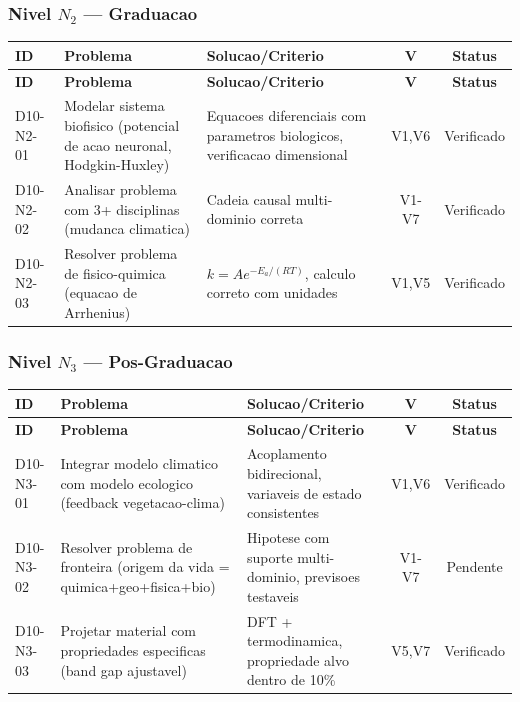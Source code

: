 \subsubsection{Nivel $N_2$ --- Graduacao}

\begin{longtable}{|p{2.0cm}|p{4.2cm}|p{4.2cm}|c|c|}
\hline
\textbf{ID} & \textbf{Problema} & \textbf{Solucao/Criterio} & \textbf{V} & \textbf{Status} \\
\hline
\endfirsthead
\hline
\textbf{ID} & \textbf{Problema} & \textbf{Solucao/Criterio} & \textbf{V} & \textbf{Status} \\
\hline
\endhead
\hline
\endfoot
D10-N2-01 & Modelar sistema biofisico (potencial de acao neuronal, Hodgkin-Huxley) & Equacoes diferenciais com parametros biologicos, verificacao dimensional & V1,V6 & Verificado \\
\hline
D10-N2-02 & Analisar problema com 3+ disciplinas (mudanca climatica) & Cadeia causal multi-dominio correta & V1-V7 & Verificado \\
\hline
D10-N2-03 & Resolver problema de fisico-quimica (equacao de Arrhenius) & $k=Ae^{-E_{a}/(RT)}$, calculo correto com unidades & V1,V5 & Verificado \\
\hline
\end{longtable}

\subsubsection{Nivel $N_3$ --- Pos-Graduacao}

\begin{longtable}{|p{2.0cm}|p{4.2cm}|p{4.2cm}|c|c|}
\hline
\textbf{ID} & \textbf{Problema} & \textbf{Solucao/Criterio} & \textbf{V} & \textbf{Status} \\
\hline
\endfirsthead
\hline
\textbf{ID} & \textbf{Problema} & \textbf{Solucao/Criterio} & \textbf{V} & \textbf{Status} \\
\hline
\endhead
\hline
\endfoot
D10-N3-01 & Integrar modelo climatico com modelo ecologico (feedback vegetacao-clima) & Acoplamento bidirecional, variaveis de estado consistentes & V1,V6 & Verificado \\
\hline
D10-N3-02 & Resolver problema de fronteira (origem da vida = quimica+geo+fisica+bio) & Hipotese com suporte multi-dominio, previsoes testaveis & V1-V7 & Pendente \\
\hline
D10-N3-03 & Projetar material com propriedades especificas (band gap ajustavel) & DFT + termodinamica, propriedade alvo dentro de 10\% & V5,V7 & Verificado \\
\hline
\end{longtable}

